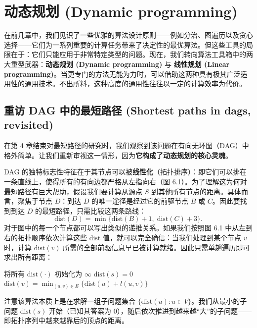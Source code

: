 \chapter{动态规划 (Dynamic programming)}

在前几章中，我们见识了一些优雅的算法设计原则——例如分治、图遍历以及贪心选择——它们为一系列重要的计算任务带来了决定性的最优算法。但这些工具的局限在于：它们只能应用于非常特定类型的问题。现在，我们转向算法工具箱中的两大重型武器：\textbf{动态规划 (Dynamic programming)} 与 \textbf{线性规划 (Linear programming)}。当更专门的方法无能为力时，可以借助这两种具有极其广泛适用性的通用技术。不出所料，这种高度的通用性往往以一定的计算效率为代价。

\section{重访 DAG 中的最短路径 (Shortest paths in dags, revisited)}

在第 4 章结束对最短路径的研究时，我们观察到该问题在有向无环图（DAG）中格外简单。让我们重新审视这一情形，因为\textbf{它构成了动态规划的核心灵魂}。

DAG 的独特标志性特征在于其节点可以被\textbf{线性化}（拓扑排序）：即它们可以排在一条直线上，使得所有的有向边都严格从左指向右（图 6.1）。为了理解这为何对最短路径有巨大帮助，假设我们要计算从源点 $S$ 到其他所有节点的距离。具体而言，聚焦于节点 $D$：到达 $D$ 的唯一途径是经过它的前驱节点 $B$ 或 $C$。因此要找到到达 $D$ 的最短路径，只需比较这两条路线：
\[
\text{dist}(D) = \min\{\text{dist}(B) + 1,\; \text{dist}(C) + 3\}.
\]
对于图中的每一个节点都可以写出类似的递推关系。如果我们按照图 6.1 中从左到右的拓扑顺序依次计算这些 $\text{dist}$ 值，就可以完全确信：当我们处理到某个节点 $v$ 时，计算 $\text{dist}(v)$ 所需的全部前驱信息早已被计算就绪。因此只需单趟遍历即可求出所有距离：

\begin{algorithmic}[1]
\State 将所有 $\text{dist}(\cdot)$ 初始化为 $\infty$
\State $\text{dist}(s) = 0$
    \State $\text{dist}(v) = \min_{(u, v) \in E} \{\text{dist}(u) + l(u, v)\}$
\EndFor
\end{algorithmic}

注意该算法本质上是在求解一组子问题集合 $\{\text{dist}(u) : u \in V\}$。我们从最小的子问题 $\text{dist}(s)$ 开始（已知其答案为 0），随后依次推进到越来越“大”的子问题——即拓扑序列中越来越靠后的顶点的距离。

